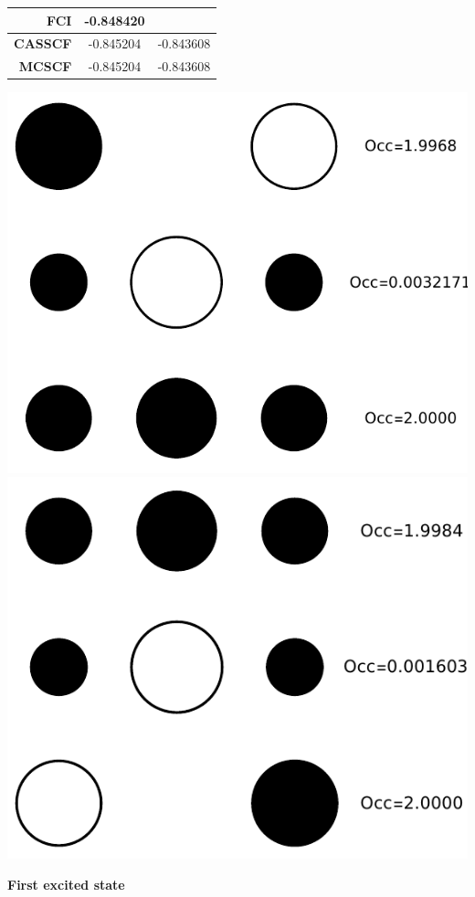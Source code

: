 \documentclass[11pt,a4paper]{article}
\begin{document}
\begin{minipage}{0.3\textwidth}
  \centering
  \begin{tabular}{r|c c}
    \textbf{FCI} & -0.848420 & \\
    \hline
    \textbf{CASSCF} & -0.845204 & -0.843608 \\
    \hline
    \textbf{MCSCF} & -0.845204 & -0.843608
  \end{tabular}
\end{minipage}
\hfill
\begin{minipage}{0.6\textwidth}
  \centering
  \includegraphics[width=0.49\linewidth]{Figures/H3_GS1_NO}
  \includegraphics[width=0.49\linewidth]{Figures/H3_GS2_NO}
  \label{fig:H3_GS_NO}
\end{minipage}

\textbf{First excited state}
\end{document}

